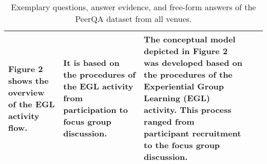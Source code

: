 \begin{table*}[!h]
{\begin{minipage}{\linewidth}
\begin{adjustbox}{angle=270}
\begin{tabularx}{0.93\textheight}{@{}p{0.1cm}p{3.1cm}Xp{3.25cm}p{6cm}@{}}
Figure 2 shows the overview of the EGL activity flow. & It is based on the procedures of the EGL activity from participation to focus group discussion. & The conceptual model depicted in Figure 2 was developed based on the procedures of the Experiential Group Learning (EGL) activity. This process ranged from participant recruitment to the focus group discussion.\\ 
\bottomrule
\end{tabularx}
\end{adjustbox}
\caption{Exemplary questions, answer evidence, and free-form answers of the PeerQA dataset from all venues.}\label{tbl:examplary-annotation}
\end{minipage}
}
\end{table*}